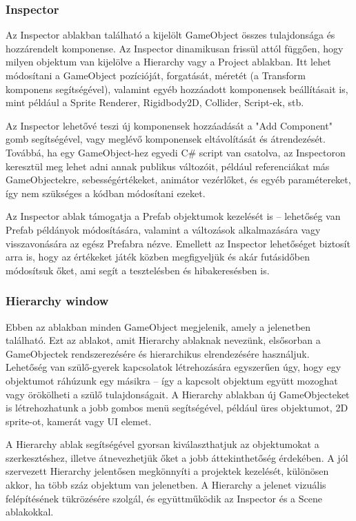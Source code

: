 \documentclass[
]{thesis-ekf}
\theoremstyle{definition}
\theoremstyle{remark}
\begin{document}
\subsubsection{Inspector}
Az Inspector ablakban található a kijelölt GameObject összes tulajdonsága és hozzárendelt komponense. Az Inspector dinamikusan frissül attól függően, hogy milyen objektum van kijelölve a Hierarchy vagy a Project ablakban. Itt lehet módosítani a GameObject pozícióját, forgatását, méretét (a Transform komponens segítségével), valamint egyéb hozzáadott komponensek beállításait is, mint például a Sprite Renderer, Rigidbody2D, Collider, Script-ek, stb.

Az Inspector lehetővé teszi új komponensek hozzáadását a "Add Component" gomb segítségével, vagy meglévő komponensek eltávolítását és átrendezését. Továbbá, ha egy GameObject-hez egyedi C\# script van csatolva, az Inspectoron keresztül meg lehet adni annak publikus változóit, például referenciákat más GameObjectekre, sebességértékeket, animátor vezérlőket, és egyéb paramétereket, így nem szükséges a kódban módosítani ezeket.

Az Inspector ablak támogatja a Prefab objektumok kezelését is – lehetőség van Prefab példányok módosítására, valamint a változások alkalmazására vagy visszavonására az egész Prefabra nézve. Emellett az Inspector lehetőséget biztosít arra is, hogy az értékeket játék közben megfigyeljük és akár futásidőben módosítsuk őket, ami segít a tesztelésben és hibakeresésben is.\cite{UnityIspector}

\subsubsection{Hierarchy window}
Ebben az ablakban minden GameObject megjelenik, amely a jelenetben található. Ezt az ablakot, amit Hierarchy ablaknak nevezünk, elsősorban a GameObjectek rendszerezésére és hierarchikus elrendezésére használjuk. Lehetőség van szülő-gyerek kapcsolatok létrehozására egyszerűen úgy, hogy egy objektumot ráhúzunk egy másikra – így a kapcsolt objektum együtt mozoghat vagy örökölheti a szülő tulajdonságait. A Hierarchy ablakban új GameObjecteket is létrehozhatunk a jobb gombos menü segítségével, például üres objektumot, 2D sprite-ot, kamerát vagy UI elemet.

A Hierarchy ablak segítségével gyorsan kiválaszthatjuk az objektumokat a szerkesztéshez, illetve átnevezhetjük őket a jobb áttekinthetőség érdekében. A jól szervezett Hierarchy jelentősen megkönnyíti a projektek kezelését, különösen akkor, ha több száz objektum van jelenetben. A Hierarchy a jelenet vizuális felépítésének tükrözésére szolgál, és együttműködik az Inspector és a Scene ablakokkal.\cite{UnityIspector}
\end{document}
